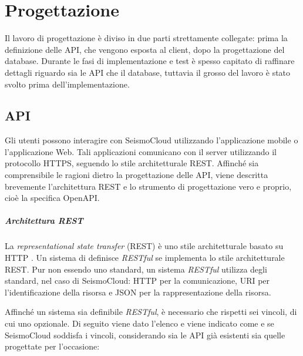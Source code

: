 \chapter{Progettazione}
\label{ch:progg}

Il lavoro di progettazione è diviso in due parti strettamente collegate: prima la definizione delle API, che vengono esposta al client, dopo la progettazione del database. Durante le fasi di implementazione e test è spesso capitato di raffinare dettagli riguardo sia le API che il database, tuttavia il grosso del lavoro è stato svolto prima dell'implementazione.

\section{API}

Gli utenti possono interagire con SeismoCloud utilizzando l'applicazione mobile o l'applicazione Web. Tali applicazioni comunicano con il server utilizzando il protocollo HTTPS, seguendo lo stile architetturale REST. Affinché sia comprensibile le ragioni dietro la progettazione delle API, viene descritta brevemente l'architettura REST e lo strumento di progettazione vero e proprio, cioè la specifica OpenAPI.

\paragraph{Architettura REST} La \textit{representational state transfer} (REST) \cite{rest} è uno stile architetturale basato su HTTP \cite{http}. Un sistema di definisce \textit{RESTful} se implementa lo stile architetturale REST. Pur non essendo uno standard, un sistema \textit{RESTful} utilizza degli standard, nel caso di SeismoCloud: HTTP per la comunicazione, URI \cite{uri} per l'identificazione della risorsa e JSON \cite{json} per la rappresentazione della risorsa.

Affinché un sistema sia definibile \textit{RESTful}, è necessario che rispetti sei vincoli, di cui uno opzionale. Di seguito viene dato l'elenco e viene indicato come e se SeismoCloud soddisfa i vincoli, considerando sia le API già esistenti sia quelle progettate per l'occasione:

